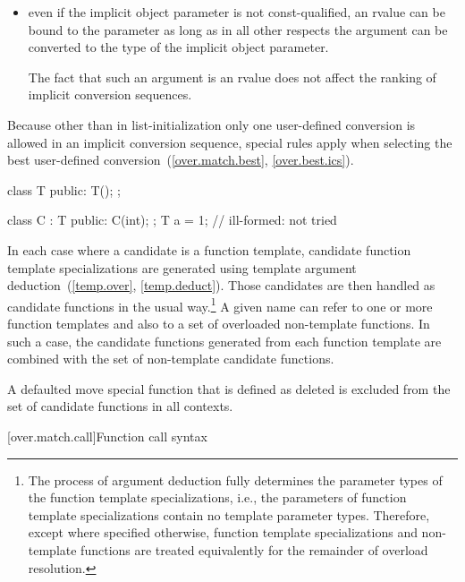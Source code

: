 \begin{itemize}
\item
even if the implicit object parameter is not
const-qualified,
an rvalue can be bound to the parameter
as long as in all other respects the argument can be
converted to the type of the implicit object parameter.
\begin{note} The fact that such an argument is an rvalue does not
affect the ranking of implicit conversion sequences.
\end{note}
\end{itemize}

\pnum
Because other than in list-initialization only one user-defined conversion
is allowed
in an
implicit conversion sequence, special rules apply when selecting
the best user-defined conversion~(\ref{over.match.best},
\ref{over.best.ics}).
\begin{example}

\begin{codeblock}
class T {
public:
  T();
};

class C : T {
public:
  C(int);
};
T a = 1;            // ill-formed:  not tried
\end{codeblock}
\end{example}

\pnum
In each case where a candidate is a function template, candidate
function template specializations
are generated using template argument deduction~(\ref{temp.over},
\ref{temp.deduct}).
Those candidates are then handled as candidate
functions in the usual way.\footnote{The process of argument deduction fully
determines the parameter types of
the
function template specializations,
i.e., the parameters of
function template specializations
contain
no template parameter types.
Therefore, except where specified otherwise,
function template specializations
and non-template functions are treated equivalently
for the remainder of overload resolution.}
A given name can refer to one or more function templates and also
to a set of overloaded non-template functions.
In such a case, the
candidate functions generated from each function template are combined
with the set of non-template candidate functions.

\pnum
A defaulted move special function that is
defined as deleted is excluded from the set of candidate functions in all
contexts.

[over.match.call]{Function call syntax}%

